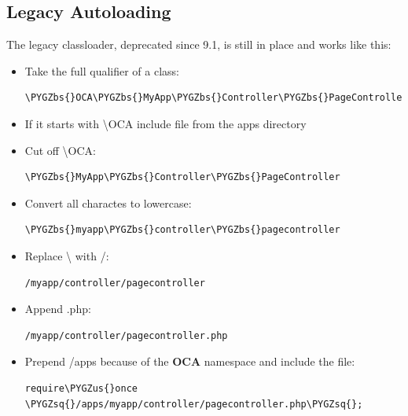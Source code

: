 \documentclass[letterpaper,10pt,english]{sphinxmanual}
\def\PYGZbs{\char`\\}
\def\PYGZus{\char`\_}
\def\PYGZsq{\char`\'}
\renewcommand\PYGZsq{\textquotesingle}
\begin{document}
\subsection{Legacy Autoloading}
\label{app/classloader:legacy-autoloading}
The legacy classloader, deprecated since 9.1, is still in place and works like this:
\begin{itemize}
\item {} 
Take the full qualifier of a class:

\begin{Verbatim}[commandchars=\\\{\}]
\PYGZbs{}OCA\PYGZbs{}MyApp\PYGZbs{}Controller\PYGZbs{}PageController
\end{Verbatim}

\item {} 
If it starts with \textbackslash{}OCA include file from the apps directory

\item {} 
Cut off \textbackslash{}OCA:

\begin{Verbatim}[commandchars=\\\{\}]
\PYGZbs{}MyApp\PYGZbs{}Controller\PYGZbs{}PageController
\end{Verbatim}

\item {} 
Convert all charactes to lowercase:

\begin{Verbatim}[commandchars=\\\{\}]
\PYGZbs{}myapp\PYGZbs{}controller\PYGZbs{}pagecontroller
\end{Verbatim}

\item {} 
Replace \textbackslash{} with /:

\begin{Verbatim}[commandchars=\\\{\}]
/myapp/controller/pagecontroller
\end{Verbatim}

\item {} 
Append .php:

\begin{Verbatim}[commandchars=\\\{\}]
/myapp/controller/pagecontroller.php
\end{Verbatim}

\item {} 
Prepend /apps because of the \textbf{OCA} namespace and include the file:

\begin{Verbatim}[commandchars=\\\{\}]
require\PYGZus{}once \PYGZsq{}/apps/myapp/controller/pagecontroller.php\PYGZsq{};
\end{Verbatim}

\end{itemize}
\end{document}

